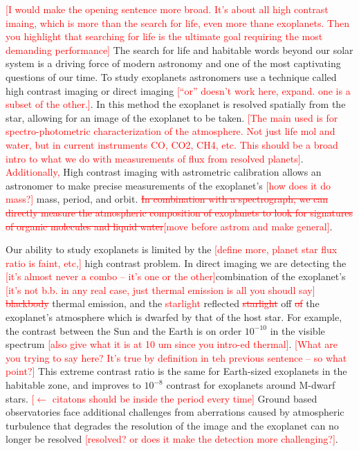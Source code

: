 \documentclass[12pt]{spieman}  %
\newcommand{\jrmadd}[1]{\textcolor{red}{#1}}
\newcommand{\jrmrmv}[1]{\textcolor{red}{\sout{#1}}}
\newcommand{\jrmcom}[1]{\textcolor{red}{[#1]}}
\begin{document}
\begin{spacing}{2}
\jrmcom{I would make the opening sentence more broad.  It's about all high contrast imaing, which is more than the search for life, even more thane exoplanets.  Then you highlight that searching for life is the ultimate goal requiring the most demanding performance} The search for life and habitable words beyond our solar system is a driving force of modern astronomy and one of the most captivating questions of our time. To study exoplanets astronomers use a technique called high contrast imaging or direct imaging \jrmcom{``or'' doesn't work here, expand.  one is a subset of the other.}. In this method the exoplanet is resolved spatially from the star, allowing for an image of the exoplanet to be taken. \jrmcom{The main used is for spectro-photometric characterization of the atmosphere. Not just life mol and water, but in current instruments CO, CO2, CH4, etc.  This should be a broad intro to what we do with measurements of flux from resolved planets}.  \jrmadd{Additionally,} High contrast imaging with astrometric calibration allows an astronomer to make precise measurements of the exoplanet’s \jrmcom{how does it do mass?} mass, period, and orbit.\cite{seager2010exoplanets} \jrmrmv{In combination with a spectrograph, we can directly measure the atmospheric composition of exoplanets to look for signatures of organic molecules and liquid water}\jrmcom{move before astrom and make general}.\cite{seager2015search}



Our ability to study exoplanets is limited by the \jrmcom{define more, planet star flux ratio is faint, etc,} high contrast problem. In direct imaging we are detecting the \jrmcom{it's almost never a combo -- it's one or the other}combination of the exoplanet’s \jrmcom{it's not b.b. in any real case, just thermal emission is all you shoudl say} \jrmrmv{blackbody} thermal emission, and the \jrmadd{starlight} reflected \jrmrmv{starlight} off \jrmrmv{of} the exoplanet’s atmosphere\cite{seager2010exoplanets} which is dwarfed by that of the host star. For example, the contrast between the Sun and the Earth is on order $10^{-10}$ in the visible spectrum \jrmcom{also give what it is at 10 um since you intro-ed thermal}. \jrmcom{What are you trying to say here?  It's true by definition in teh previous sentence -- so what point?} This extreme contrast ratio is the same for Earth-sized exoplanets in the habitable zone, and improves to $10^{-8}$ contrast for exoplanets around M-dwarf stars.\cite{males2014direct} \jrmcom{$\leftarrow$ citatons should be inside the period every time} Ground based observatories face additional challenges from aberrations caused by atmospheric turbulence that degrades the resolution of the image and the exoplanet can no longer be resolved \jrmcom{resolved? or does it make the detection more challenging?}.


\end{spacing}
\end{document}

